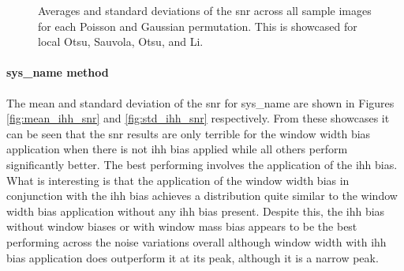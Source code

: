 \begin{figure}[h!]
    \centering
    \caption[Averages and standard deviations of the PSNR across all sample images for each Poisson and Gaussian permutation]{Averages and standard deviations of the \gls{snr} across all sample images for each Poisson and Gaussian permutation. This is showcased for local Otsu, Sauvola, Otsu, and Li.}
    \label{fig:snr_thresh_surface}
\end{figure}

\paragraph{\gls{sys_name} method}
The mean and standard deviation of the \gls{snr} for \gls{sys_name} are shown in Figures \ref{fig:mean_ihh_snr} and \ref{fig:std_ihh_snr} respectively. From these showcases it can be seen that the \gls{snr} results are only terrible for the window width bias application when there is not \gls{ihh} bias applied while all others perform significantly better. The best performing involves the application of the \gls{ihh} bias. What is interesting is that the application of the window width bias in conjunction with the \gls{ihh} bias achieves a distribution quite similar to the window width bias application without any \gls{ihh} bias present. Despite this, the \gls{ihh} bias without window biases or with window mass bias appears to be the best performing across the noise variations overall although window width with \gls{ihh} bias application does outperform it at its peak, although it is a narrow peak.

